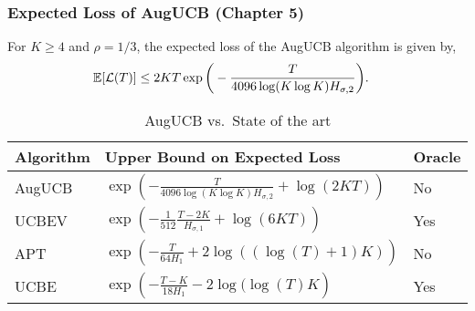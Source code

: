 \begin{frame}
\frametitle{Expected Loss of AugUCB ({Chapter 5})}

\begin{theorem}
For $K\geq 4$ and $\rho={1}/{3}$,
the expected loss of the AugUCB algorithm is given by,
\begin{align*}
\mathbb{E}[\mathcal{L}(T)]
& \leq 2KT \exp\bigg(- \frac{T}{4096 \log( K\log K) H_{\sigma,2}} \bigg).
\end{align*}
\end{theorem}


\begin{table}[b]
\caption{AugUCB vs.\ State of the art}
\label{tab:regret-bds}
\begin{center}
\begin{tabular}{|p{1.5cm}|p{6.4cm}|p{1.5cm}|}
\hline
Algorithm  & Upper Bound on Expected Loss & Oracle \\
\hline
AugUCB      &$ \exp\left(- \frac{T}{4096 \log(K\log K)H_{\sigma,2}} + \log\left(2KT\right) \right) $ & No\\
\hline
UCBEV		&$\exp\left(-\frac{1}{512}\frac{T-2K}{H_{\sigma,1}} + \log\left(6KT\right)\right)$ & Yes\\
\hline
APT         &$\exp\left(-\frac{T}{64 H_1}+2\log((\log(T)+1)K)\right)$ & No\\
\hline
UCBE		&$\exp\left(-\frac{T-K}{18 H_1} - 2\log(\log(T)K\right)$ &  Yes\\
\hline

\end{tabular}
\end{center}
\end{table}
\end{frame}

%
%

